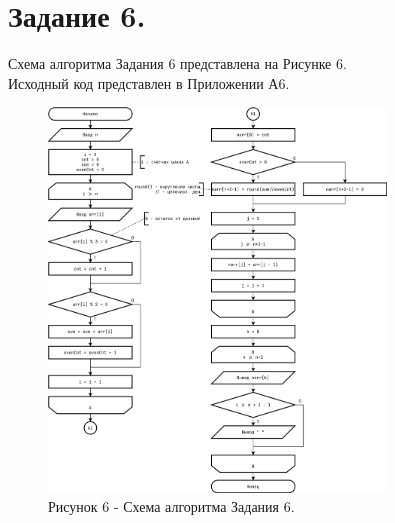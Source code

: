 \documentclass[oneside,a4paper,14pt]{extarticle}
\begin{document}
\section*{Задание 6.}
\noindent Схема алгоритма Задания 6 представлена на Рисунке 6.\\
\noindent Исходный код представлен в Приложении А6. \\
\newpage
\begin{figure}[!ht]
	\centering
	\includegraphics[width=0.8\textwidth]{pics/flowchart-18.png}
	\caption*{Рисунок 6 - Схема алгоритма Задания 6.}
\end{figure}
\end{document}
